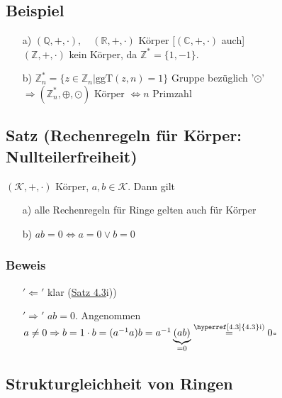 \documentclass[a4paper, 12pt,titlepage, pdf, headsepline]{article}
\newcommand{\qed}{\hfill$\square$}
\renewcommand{\>}{\rightarrow}
\renewcommand{\*}{\cdot}
\begin{document}
	      \subsection{Beispiel}
	      \begin{itemize}
	      	\item[a)] $(\mathds{Q},+,\cdot),\quad (\mathds{R},+,\cdot)$ Körper $[(\mathds{C},+,\cdot)$ auch] \\
	      	      $(\mathds{Z},+,\cdot)$ kein Körper, da $\mathds{Z}^* = \{1,-1\}$.
	      	\item[b)] $\mathds{Z}_n^* = \{z \in \mathds{Z}_n| \text{ggT}(z,n) = 1\}$ Gruppe bezüglich '$\odot$'\\
	      	      $\Rightarrow (\mathds{Z}_n^*, \oplus, \odot)$ Körper $\Leftrightarrow n$ Primzahl
	      \end{itemize}
	      	
	      \subsection{Satz (Rechenregeln für Körper: Nullteilerfreiheit)}
	      \label{4.7}	
	      $(\mathcal{K},+,\cdot)$ Körper, $a,b \in \mathcal{K}$. Dann gilt
	      \begin{itemize}
	      	\item[a)] alle Rechenregeln für Ringe gelten auch für Körper
	      	\item[b)] $ab = 0 \Leftrightarrow a = 0\vee b = 0$ \qquad [Gegenbeispiel: $(\mathds{Z}_6, \oplus, \odot)$, weil $2 \odot 3 = 0$]
	      \end{itemize}
	      \subsubsection*{Beweis}
	      \begin{itemize}
	      	\item[$'\Leftarrow'$] klar (\hyperref[4.3]{Satz 4.3}i))
	      	\item[$'\Rightarrow'$] $ab = 0$. Angenommen $a \neq 0 \Rightarrow b=1 \cdot b = (a^{-1}a)b = a^{-1}\underbrace{(ab)}_{= 0} \overset{\textrm{\hyperref[4.3]{4.3}i)}}{=} 0$\qed
	      \end{itemize}
	      	
	      \subsection*{Strukturgleichheit von Ringen}
\end{document}
